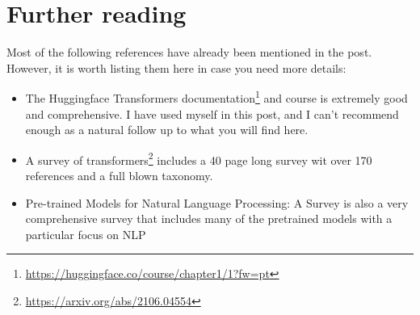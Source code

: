 \documentclass{article}
\begin{document}
\section{Further reading}

Most of the following references have already been mentioned in the post. However, it is worth listing them here in case you need more details:

\begin{itemize}
    \item The Huggingface Transformers documentation\footnote{\url{https://huggingface.co/course/chapter1/1?fw=pt}} and course is extremely good and comprehensive. I have used myself in this post, and I can’t recommend enough as a natural follow up to what you will find here.
    \item A survey of transformers\footnote{\url{https://arxiv.org/abs/2106.04554}}\cite{lin2022survey} includes a 40 page long survey wit over 170 references and a full blown taxonomy.
    \item Pre-trained Models for Natural Language Processing: A Survey\cite{qiu2020pre} is also a very comprehensive survey that includes many of the pretrained models with a particular focus on NLP

\end{itemize}
\end{document}

